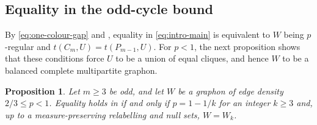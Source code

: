 \documentclass[11pt]{article}
\newtheorem{proposition}[theorem]{Proposition}
\theoremstyle{remark}
\numberwithin{equation}{section}
\newcommand{\tC}[2]{t(C_{#1},#2)}
\newcommand{\tP}[2]{t(P_{#1},#2)}
\begin{document}
\subsection{Equality in the odd-cycle bound}
\label{subsec:main-equality}

By \eqref{eq:one-colour-gap} and , equality in
\eqref{eq:intro-main} is equivalent to $W$ being $p$-regular and
$\tC mU=\tP{m-1}U$.
For $p<1$, the next proposition shows that these conditions force $U$ to
be a union of equal cliques, and hence $W$ to be a balanced complete
multipartite graphon.

\begin{proposition}
\label{prop:main-equality}
  Let $m\ge3$ be odd, and let $W$ be a graphon of edge density $2/3\le p<1$.
  Equality holds in  if and only if $p=1-1/k$ for an integer $k\ge3$ and, up to a measure-preserving relabelling and null sets, $W=W_k$.
\end{proposition}
\end{document}

